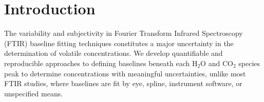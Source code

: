 \documentclass[draft]{agujournal2019}
\begin{document}
%
%

%


%
%
%
%

\section{Introduction} %
The variability and subjectivity in Fourier Transform Infrared Spectroscopy (FTIR) baseline fitting techniques constitutes a major uncertainty in the determination of volatile concentrations. We develop quantifiable and reproducible approaches to defining baselines beneath each H$_{2}$O and CO$_2$ species peak to determine concentrations with meaningful uncertainties, unlike most FTIR studies, where baselines are fit by eye, spline, instrument software, or unspecified means. 
\end{document}

